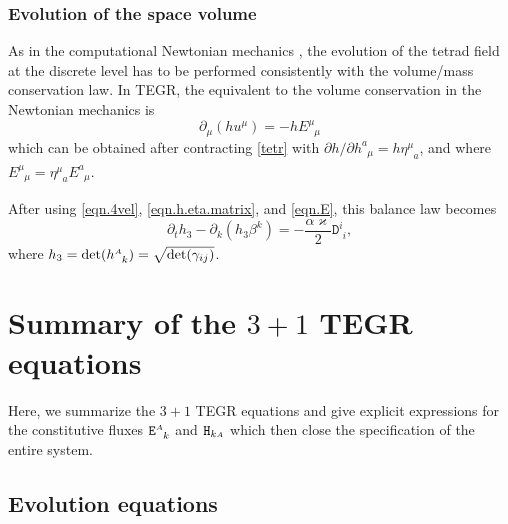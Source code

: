 \documentclass[
10pt, %
a4paper, %
oneside, %
twocolumn,
headinclude,footinclude, %
BCOR5mm, %
]{scrartcl}
\newcommand{\sA}{\mathsmaller A}
\newcommand{\pd}[1]{\partial_{#1}}
\newcommand{\tetrsymbol}{h}
\newcommand{\itetrsymbol}{\eta}
\newcommand{\itetr}[2]{\itetrsymbol^{#1}_{\phantom{#1}#2}}
\newcommand{\tetr}[2]{\tetrsymbol^{#1}_{\phantom{#1}#2}}
\newcommand{\detTetr}{\tetrsymbol}
\newcommand{\ET}[2]{E^{#1}_{\phantom{#1}#2}}	%
\newcommand{\Dfin}[2]{\mathtt{D}_{\phantom{#2}#1}^{#2}}	%
\newcommand{\Hfin}[2]{\mathtt{H}_{#2#1}}	%
\newcommand{\Efin}[2]{\mathtt{E}^{#1}_{\phantom{#1}#2}}	%
\newcommand{\shift}[1]{\beta^{#1}}
\begin{document}
	
	
	\subsubsection{Evolution of the space volume}
	
	As in the computational Newtonian mechanics \cite{DPRZ2016,SIGPR2021}, the evolution of the 
	tetrad 
	field at the discrete level has to be performed consistently with the volume/mass conservation 
	law. 
	In 
	TEGR, the equivalent to the volume conservation in the Newtonian mechanics is 
	\begin{equation}\label{eqn.pde.det}
		\pd{\mu}(\detTetr u^\mu) = -\detTetr \ET{\mu}{\mu} 
	\end{equation} 
	which can be obtained after contracting \eqref{tetr} with $ \partial \detTetr/\partial 
	\tetr{a}{\mu} 
	= \detTetr
	\itetr{\mu}{a} $, and where $ \ET{\mu}{\mu} = \itetr{\mu}{a} \ET{a}{\mu}$.
	
	
	After using \eqref{eqn.4vel}, \eqref{eqn.h.eta.matrix}, and \eqref{eqn.E}, this balance law 
	becomes
	\begin{equation}\label{eqn.h.PDE}
		\pd{t}\detTetr_3 - \pd{k}(\detTetr_3\shift{k} ) =-\frac{\alpha \varkappa}{2} \Dfin{i}{i},
	\end{equation}
	where $ \detTetr_3 =\det(\tetr{\sA}{k}) = \sqrt{\det(\gamma_{ij})} $.
	
	
	
	
	\section{Summary of the $ 3+1 $ TEGR equations}
	Here, we summarize the $ 3+1 $ TEGR equations and give explicit expressions for the 
	constitutive 
	fluxes $ \Efin{\sA}{k} $ and
	$ \Hfin{\sA}{k} $ which then close the specification of the entire system.
	
	
	\subsection{Evolution equations}
	
\end{document}
